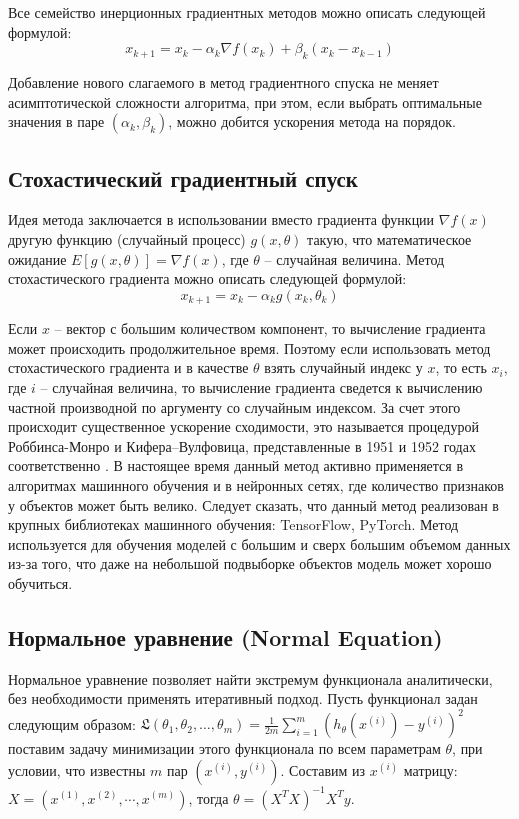 Все семейство инерционных градиентных методов можно описать следующей формулой:
$$ x_{k+1} = x_k - \alpha_k \nabla f(x_k) + \beta_k (x_k - x_{k-1}) $$

Добавление нового слагаемого в метод градиентного спуска не меняет асимптотической сложности алгоритма, при этом, если выбрать оптимальные значения в паре $(\alpha_k, \beta_k)$, можно добится ускорения метода на порядок.


\subsection{Стохастический градиентный спуск}

Идея метода заключается в использовании вместо градиента функции $\nabla f(x)$ другую функцию (случайный процесс) $g(x,\theta)$ такую, что математическое ожидание $E[g(x,\theta)] = \nabla f(x)$, где $\theta$ -- случайная величина.
Метод стохастического градиента можно описать следующей формулой:
$$ x_{k+1} = x_k - \alpha_k g(x_k,\theta_k) $$

Если $x$ -- вектор с большим количеством компонент, то вычисление градиента может происходить продолжительное время. Поэтому если использовать метод стохастического градиента и в качестве $\theta$ взять случайный индекс у $x$, то есть $x_i$, где $i$ -- случайная величина, то вычисление градиента сведется к вычислению частной производной по аргументу со случайным индексом. За счет этого происходит существенное ускорение сходимости, это называется процедурой Роббинса-Монро и Кифера–Вулфовица, представленные в 1951 и 1952 годах соответственно \cite{wiki:stochastic_grad}. В настоящее время данный метод активно применяется в алгоритмах машинного обучения и в нейронных сетях, где количество признаков у объектов может быть велико. Следует сказать, что данный метод реализован в крупных библиотеках машинного обучения: TensorFlow, PyTorch. Метод используется для обучения моделей с большим и сверх большим объемом данных из-за того, что даже на небольшой подвыборке объектов модель может хорошо обучиться.


\subsection{Нормальное уравнение (Normal Equation)}

Нормальное уравнение позволяет найти экстремум функционала аналитически, без необходимости применять итеративный подход. Пусть функционал задан следующим образом: $\mathfrak{L}(\theta_1,\theta_2,\dots,\theta_m) = \frac{1}{2m} \sum\limits_{i=1}^{m}(h_{\theta}(x^{(i)}) - y^{(i)})^2$ поставим задачу минимизации этого функционала по всем параметрам $\theta$, при условии, что известны $m$ пар $(x^{(i)}, y^{(i)})$. Составим из $x^{(i)}$ матрицу: $X = (x^{(1)}, x^{(2)}, \cdots, x^{(m)})$, тогда $\theta = (X^{T} X)^{-1} X^{T} y$.

